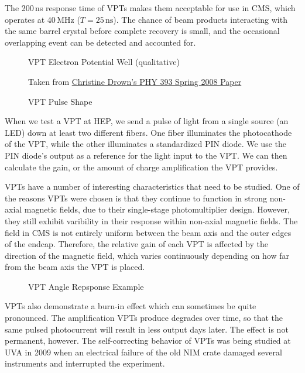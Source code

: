 The 200\,ns response time of VPTs makes them acceptable for use in CMS, which operates at 40\,MHz ($T=25\,\mathrm{ns}$).  The chance of beam products interacting with the same barrel crystal before complete recovery is small, and the occasional overlapping event can be detected and accounted for.


\begin{figure}[htbp]
  \centering
  
  \caption{VPT Electron Potential Well (qualitative)}
  \label{fig:eq_vpt:vpt_potential}
\end{figure}

\begin{figure}[htbp]
  \centering
  {
    \tiny Taken from \href{papers/VPT_Phys393}{Christine Drown's PHY 393 Spring 2008 Paper}\\
  }
  \caption{VPT Pulse Shape}
  \label{fig:eq_vpt:vpt_pulse}
\end{figure}

When we test a VPT at HEP, we send a pulse of light from a single source (an LED) down at least two different fibers.  One fiber illuminates the photocathode of the VPT, while the other illuminates a standardized PIN diode.  We use the PIN diode's output as a reference for the light input to the VPT.  We can then calculate the gain, or the amount of charge amplification the VPT provides.

VPTs have a number of interesting characteristics that need to be studied.  One of the reasons VPTs were chosen is that they continue to function in strong non-axial magnetic fields, due to their single-stage photomultiplier design.  However, they still exhibit varibility in their response within non-axial magnetic fields.  The field in CMS is not entirely uniform between the beam axis and the outer edges of the endcap.  Therefore, the relative gain of each VPT is affected by the direction of the magnetic field, which varies continuously depending on how far from the beam axis the VPT is placed.

\begin{figure}[htbp]
  \centering
  \caption{VPT Angle Repsponse Example}
  \label{fig:eq_vpt:vpt_angle_response}
\end{figure}

VPTs also demonstrate a burn-in effect which can sometimes be quite pronounced.  The amplification VPTs produce degrades over time, so that the same pulsed photocurrent will result in less output days later.  The effect is not permanent, however.  The self-correcting behavior of VPTs was being studied at UVA in 2009 when an electrical failure of the old NIM crate damaged several instruments and interrupted the experiment.

